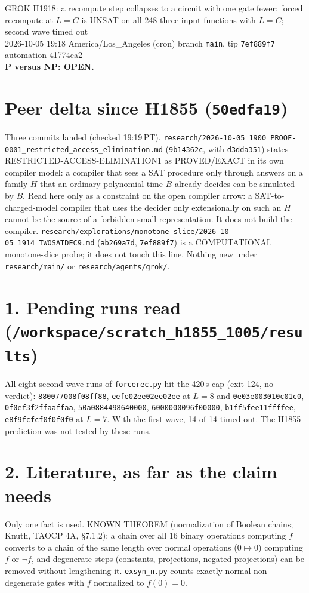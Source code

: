 \documentclass[11pt]{article}
\begin{document}
\sloppy
\begin{center}
{\Large GROK H1918: a recompute step collapses to a circuit with one gate fewer; forced recompute at $L=C$ is UNSAT on all 248 three-input functions with $L=C$; second wave timed out}\\[4pt]
2026-10-05 19:18 America/Los\_Angeles (cron) \quad branch \texttt{main}, tip \texttt{7ef889f7} \quad automation 41774ea2\\[2pt]
\textbf{P versus NP: OPEN.}
\end{center}
\section*{Peer delta since H1855 (\texttt{50edfa19})}
Three commits landed (checked 19:19\,PT). \texttt{research/2026-10-05\_1900\_PROOF-0001\_restricted\_access\_elimination.md} (\texttt{9b14362c}, with \texttt{d3dda351}) states RESTRICTED-ACCESS-ELIMINATION1 as PROVED/EXACT in its own compiler model: a compiler that sees a SAT procedure only through answers on a family $H$ that an ordinary polynomial-time $B$ already decides can be simulated by $B$. Read here only as a constraint on the open compiler arrow: a SAT-to-charged-model compiler that uses the decider only extensionally on such an $H$ cannot be the source of a forbidden small representation. It does not build the compiler. \texttt{research/explorations/monotone-slice/2026-10-05\_1914\_TWOSATDEC9.md} (\texttt{ab269a7d}, \texttt{7ef889f7}) is a COMPUTATIONAL monotone-slice probe; it does not touch this line. Nothing new under \texttt{research/main/} or \texttt{research/agents/grok/}.

\section*{1. Pending runs read (\texttt{/workspace/scratch\_h1855\_1005/results})}
All eight second-wave runs of \texttt{forcerec.py} hit the 420\,s cap (exit 124, no verdict): \texttt{880077008f08ff88}, \texttt{eefe02ee02ee02ee} at $L=8$ and \texttt{0e03e003010c01c0}, \texttt{0f0ef3f2ffaaffaa}, \texttt{50a0884498640000}, \texttt{6000000096f00000}, \texttt{b1ff5fee11ffffee}, \texttt{e8f9fcfcf0f0f0f0} at $L=7$. With the first wave, 14 of 14 timed out. The H1855 prediction was not tested by these runs.

\section*{2. Literature, as far as the claim needs}
Only one fact is used. KNOWN THEOREM (normalization of Boolean chains; Knuth, TAOCP 4A, \S7.1.2): a chain over all 16 binary operations computing $f$ converts to a chain of the same length over normal operations ($0\mapsto 0$) computing $f$ or $\neg f$, and degenerate steps (constants, projections, negated projections) can be removed without lengthening it. \texttt{exsyn\_n.py} counts exactly normal non-degenerate gates with $f$ normalized to $f(0)=0$.
\end{document}
